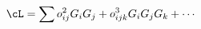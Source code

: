\begin{equation}
\cL = \sum o^2_{i j} G_i G_j + o^3_{i j k} G_i G_j G_k +
\cdots \label{olapL}
\end{equation} 
